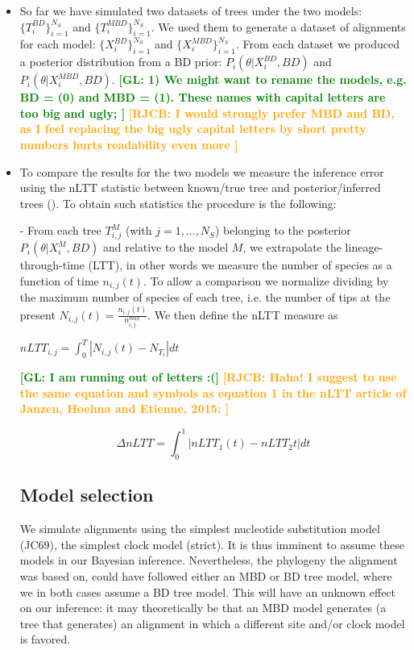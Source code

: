 \documentclass{article}
\newcommand*\richel[1]{\textcolor{orange}{\textbf{[RJCB: #1]}}}
\newcommand*\gio[1]{\textcolor{green}{\textbf{[GL: #1]}}}
\begin{document}
\begin{itemize}
\item So far we have simulated two datasets of trees under the two models: 
$\{T_{i}^{BD}\}_{i=1}^{N_{S}}$ and $\{T_{i}^{MBD}\}_{i=1}^{N_{S}}$.
We used them to generate a dataset of alignments for each model: $\{X^{BD}_{i}\}_{i=1}^{N_{S}}$ and $\{X^{MBD}_{i}\}_{i=1}^{N_{S}}$. From each dataset we produced a posterior distribution from a BD prior: 
$P_{i}(\theta | X^{BD}_{i}, BD)$ and $P_{i}(\theta | X^{MBD}_{i}, BD)$.
\gio{
  1) We might want to rename the models, e.g. BD = (0) and MBD = (1). 
  These names with capital letters are too big and ugly;
}
\richel{
  I would strongly prefer MBD and BD, as I feel replacing the big ugly 
  capital letters by short pretty numbers hurts readability even more 
}

\item To compare the results for the two models we measure the inference 
error using the nLTT statistic between known/true tree and 
posterior/inferred trees (\cite{nltt}). 
To obtain such statistics the procedure is the following:

- From each tree $T_{i,j}^{M}$ (with $j=1,...,N_{S}$) 
  belonging to the posterior $P_{i}(\theta | X^{M}_{i}, BD)$ 
  and relative to the model $M$, we extrapolate the lineage-through-time (LTT), 
  in other words we measure the number of species as a function of 
  time $n_{i,j}(t)$. To allow a comparison we normalize dividing by the 
  maximum number of species of each tree, i.e. the number of tips at the 
  present $N_{i,j}(t)=\frac{n_{i,j}(t)}{n^{max}_{i,j}}$. We then define the 
  nLTT measure as

$nLTT_{i,j} = \int_{0}^{T} | N_{i,j}(t) - N_{T_{i}} | dt$

\gio{I am running out of letters :(}
\richel{Haha! I suggest to use the same equation and symbols 
  as equation 1 in
  the nLTT article of Janzen, Hoehna and Etienne, 2015:
}

$$
\Delta nLTT = \int_{0}^{1} | nLTT_1(t) - nLTT_2{t} | dt
$$

\subsection{Model selection}

We simulate alignments using the simplest nucleotide substitution model (JC69),
the simplest clock model (strict). It is thus imminent to assume these
models in our Bayesian inference. Nevertheless, the phylogeny the alignment
was based on, could have followed either an MBD or BD tree model, 
where we in both cases assume a BD tree model. This will have 
an unknown effect on our inference: it may theoretically be that an MBD model
generates (a tree that generates) an alignment in which a different site 
and/or clock model is favored. 


\end{itemize}
\end{document}
